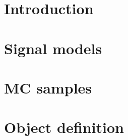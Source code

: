 \documentclass[UKenglish,texlive=2013]{\ATLASLATEXPATH atlasdoc}
\begin{document}
\maketitle

\tableofcontents

\clearpage
{}
\clearpage

%

\section{Introduction}
\label{sec:intro}



% 


\section{Signal models}
\label{sec:signal}


\section{MC samples}
\label{sec:samples}


\FloatBarrier

\section{Object definition}
\label{sec:objects}

\end{document}

